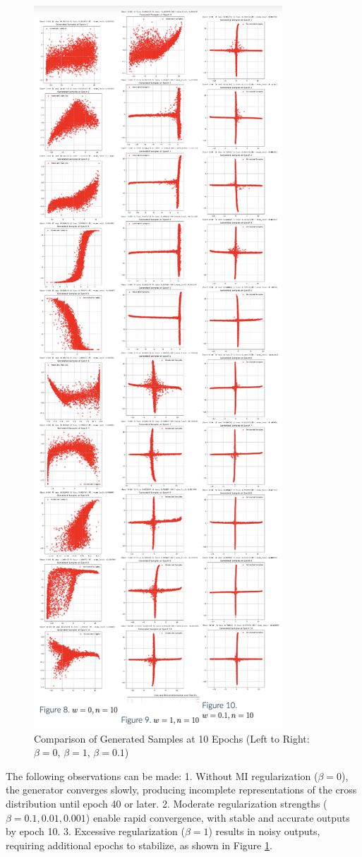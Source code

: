 \documentclass[lettersize,journal]{IEEEtran}
\begin{document}
\begin{figure}[!ht]
    \centering
    \includegraphics[width=0.5\linewidth]{figures/cross_10epochs.png}
    \caption{Comparison of Generated Samples at 10 Epochs (Left to Right: \( \beta = 0 \), \( \beta = 1 \), \( \beta = 0.1 \))}
    \label{fig:10-epochs}
\end{figure}

The following observations can be made:
1. Without MI regularization (\( \beta = 0 \)), the generator converges slowly, producing incomplete representations of the cross distribution until epoch 40 or later.
2. Moderate regularization strengths (\( \beta = 0.1, 0.01, 0.001 \)) enable rapid convergence, with stable and accurate outputs by epoch 10.
3. Excessive regularization (\( \beta = 1 \)) results in noisy outputs, requiring additional epochs to stabilize, as shown in Figure \ref{fig:10-epochs}.
\end{document}
